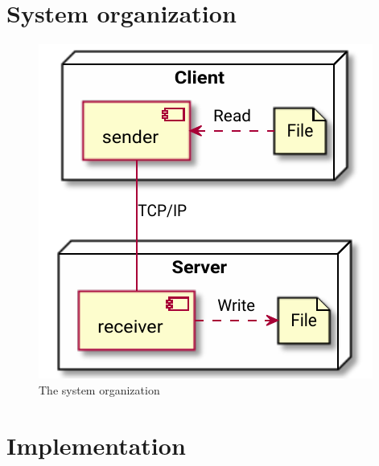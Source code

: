\documentclass{article}
\begin{document}
\section{System organization}

\begin{figure}
	\centering
	\includegraphics{pw1/system-org.pdf}
	\caption{The system organization}
\end{figure}

\section{Implementation}
\end{document}
